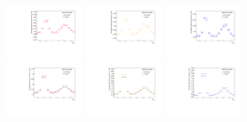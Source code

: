 \begin{figure}
\begin{figure}[ht]
    \centering
    \includegraphics[width=0.32\textwidth]{figures/analysis/h_lambda_dphi_subtracted_0_20_singletrigger.pdf}
    \includegraphics[width=0.32\textwidth]{figures/analysis/h_lambda_dphi_subtracted_20_50_singletrigger.pdf}
    \includegraphics[width=0.32\textwidth]{figures/analysis/h_lambda_dphi_subtracted_50_80_singletrigger.pdf}
    \includegraphics[width=0.32\textwidth]{figures/analysis/h_h_dphi_0_20_singletrigger.pdf}
    \includegraphics[width=0.32\textwidth]{figures/analysis/h_h_dphi_20_50_singletrigger.pdf}
    \includegraphics[width=0.32\textwidth]{figures/analysis/h_h_dphi_50_80_singletrigger.pdf}

\end{figure}
\end{figure}
